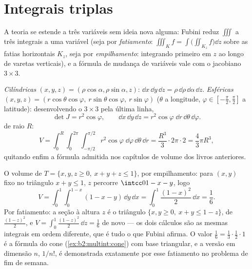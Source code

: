\section{Integrais triplas}

A teoria se estende a três variáveis sem ideia nova alguma: Fubini
reduz $\iiint$ a três integrais a uma variável (seja por
\emph{fatiamento}: $\iiint_K f = \int\bigl(\iint_{K_z}
f\bigr)\dd z$ sobre as fatias horizontais $K_z$, seja por
\emph{empilhamento}: integrando primeiro em $z$ ao longo de varetas verticais),
e a fórmula de mudança de variáveis vale com o jacobiano
$3 \times 3$.

\begin{example}\label{ex:b2:multint:spherical}
\emph{Cilíndricas} $(x, y, z) = (\rho\cos\alpha, \rho\sin\alpha,
z)$: $\dd x\,\dd y\,\dd z = \rho\,\dd\rho\,\dd\alpha\,\dd z$.
\emph{Esféricas} $(x, y, z) = (r\cos\theta\cos\varphi,\
r\sin\theta\cos\varphi,\ r\sin\varphi)$ ($\theta$ a longitude,
$\varphi \in [-\frac\pi2, \frac\pi2]$ a latitude): desenvolvendo o  $3
\times 3$ pela última linha,
\[
\det J = r^2\cos\varphi ,
\qquad
\dd x\,\dd y\,\dd z
= r^2\cos\varphi\;\dd r\,\dd\theta\,\dd\varphi .
\]
 de raio $R$:
\[
V = \int_0^R\!\!\int_0^{2\pi}\!\!\int_{-\pi/2}^{\pi/2}
r^2\cos\varphi\;\dd\varphi\,\dd\theta\,\dd r
= \frac{R^3}{3}\cdot 2\pi \cdot 2
= \boxed{\frac43\pi R^3} ,
\]
quitando enfim a fórmula admitida nos capítulos de volume dos
livros anteriores.
\end{example}

\begin{example}
\label{ex:b2:multint:tetra}
O volume de $T = \{x, y, z \geq 0,\ x + y + z \leq 1\}$, por
empilhamento: para $(x, y)$ fixo no triângulo $x + y \leq 1$,
$z$ percorre $\intcc0{1 - x - y}$, logo
\[
V = \int_0^1\!\!\int_0^{1-x}(1 - x - y)\,\dd y\,\dd x
= \int_0^1\frac{(1 - x)^2}{2}\,\dd x = \frac16 .
\]
Por fatiamento: a seção à altura $z$ é o triângulo $\{x, y
\geq 0,\ x + y \leq 1 - z\}$, de  $\frac{(1-z)^2}2$, e
$V = \int_0^1\frac{(1-z)^2}2\,\dd z = \frac16$ de novo --- os
dois cálculos são as mesmas integrais em ordem
diferente, que é tudo o que Fubini afirma. O valor $\frac16 =
\frac13\cdot\frac12\cdot1$ é a fórmula do cone
(\cref{ex:b2:multint:cone}) com base triangular, e a versão
em dimensão $n$, $1/n!$, é demonstrada exatamente por esse
fatiamento no problema de fim de semana.
\end{example}

